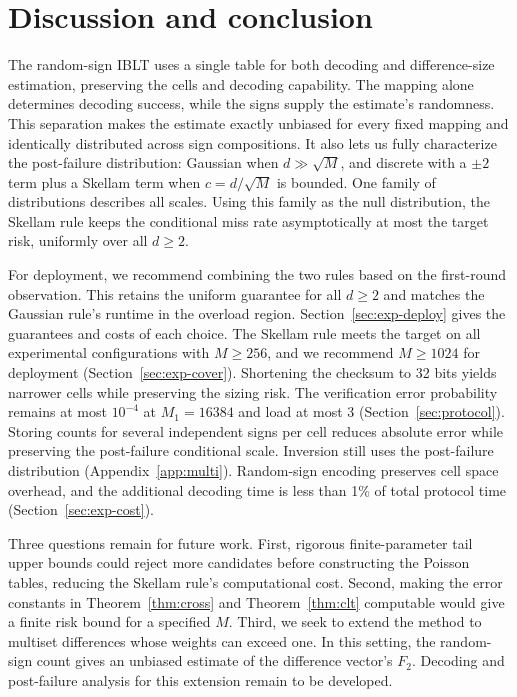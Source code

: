 \section{Discussion and conclusion}\label{sec:conclusion}
The random-sign IBLT uses a single table for both decoding and difference-size estimation, preserving the cells and decoding capability. The mapping alone determines decoding success, while the signs supply the estimate's randomness. This separation makes the estimate exactly unbiased for every fixed mapping and identically distributed across sign compositions. It also lets us fully characterize the post-failure distribution: Gaussian when $d\gg\sqrt M$, and discrete with a $\pm2$ term plus a Skellam term when $c=d/\sqrt M$ is bounded. One family of distributions describes all scales. Using this family as the null distribution, the Skellam rule keeps the conditional miss rate asymptotically at most the target risk, uniformly over all $d\ge2$.

For deployment, we recommend combining the two rules based on the first-round observation. This retains the uniform guarantee for all $d\ge2$ and matches the Gaussian rule's runtime in the overload region. Section~\ref{sec:exp-deploy} gives the guarantees and costs of each choice. The Skellam rule meets the target on all experimental configurations with $M\ge256$, and we recommend $M\ge1024$ for deployment (Section~\ref{sec:exp-cover}). Shortening the checksum to 32 bits yields narrower cells while preserving the sizing risk. The verification error probability remains at most $10^{-4}$ at $M_1=16384$ and load at most 3 (Section~\ref{sec:protocol}). Storing counts for several independent signs per cell reduces absolute error while preserving the post-failure conditional scale. Inversion still uses the post-failure distribution (Appendix~\ref{app:multi}). Random-sign encoding preserves cell space overhead, and the additional decoding time is less than 1\% of total protocol time (Section~\ref{sec:exp-cost}).

Three questions remain for future work. First, rigorous finite-parameter tail upper bounds could reject more candidates before constructing the Poisson tables, reducing the Skellam rule's computational cost. Second, making the error constants in Theorem~\ref{thm:cross} and Theorem~\ref{thm:clt} computable would give a finite risk bound for a specified $M$. Third, we seek to extend the method to multiset differences whose weights can exceed one. In this setting, the random-sign count gives an unbiased estimate of the difference vector's $F_2$. Decoding and post-failure analysis for this extension remain to be developed.
